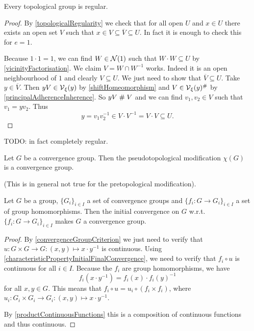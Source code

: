 \begin{proposition}
Every topological group is regular.
\end{proposition}
\begin{proof}
By \ref{topologicalRegularity} we check that for all open $U$ and $x\in U$ there exists an open set $V$ such that $x\in V\subseteq \overline{V}\subseteq U$. In fact it is enough to check this for $e = 1$.\

Because $1\cdot 1 = 1$, we can find $W\in\operatorname{\mathcal{N}}(1)$ such that $W\cdot W \subseteq U$ by \ref{vicinityFactorisation}. We claim $V= W\cap W^{-1}$ works. Indeed it is an open neighbourhood of $1$ and clearly $V\subseteq U$. We just need to show that $\overline{V}\subseteq U$. Take $y\in \overline{V}$. Then $yV\in \operatorname{\mathcal{V}}_\xi(y)$ by \ref{shiftHomeomorphism} and $V\in \operatorname{\mathcal{V}}_\xi(y)^{\mathrel{\#}}$ by \ref{principalAdherenceInherence}. So $yV\mathrel{\#} V$ and we can find $v_1,v_2\in V$ such that $v_1 = yv_2$. Thus
\[ y = v_1v_2^{-1} \in V\cdot V^{-1} = V\cdot V \subseteq U. \]
\end{proof}
TODO: in fact completely regular.

\begin{proposition}
Let $G$ be a convergence group. Then the pseudotopological modification $\chi(G)$ is a convergence
group.
\end{proposition}
(This is in general not true for the pretopological modification).
\begin{proposition} \label{initialConvergenceGroup}
Let $G$ be a group, $\{G_i\}_{i\in I}$ a set of convergence groups and $\{f_i: G \to G_i\}_{i\in I}$ a set of group homomorphisms. Then the initial convergence on $G$ w.r.t. $\{f_i: G \to G_i\}_{i\in I}$ makes $G$ a convergence group.
\end{proposition}
\begin{proof}
By \ref{convergenceGroupCriterion} we just need to verify that $u: G\times G \to G: (x,y)\mapsto x\cdot y^{-1}$ is continuous. Using \ref{characteristicPropertyInitialFinalConvergence}, we need to verify that $f_i\circ u$ is continuous for all $i\in I$. Because the $f_i$ are group homomorphisms, we have
\[ f_i(x\cdot y^{-1}) = f_i(x)\cdot f_i(y)^{-1} \]
for all $x, y \in G$. This means that $f_i\circ u = u_i \circ (f_i\times f_i)$, where $u_i: G_i\times G_i \to G_i: (x,y)\mapsto x\cdot y^{-1}$.

By \ref{productContinuousFunctions} this is a composition of continuous functions and thus continuous.
\end{proof}

